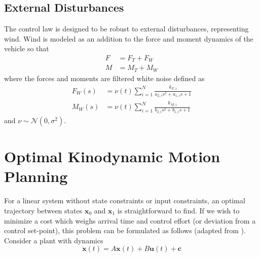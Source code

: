 \documentclass[letterpaper, 10 pt, conference]{ieeeconf}\usepackage[margin=1in]{geometry}
\begin{document}
\subsection{External Disturbances}
The control law is designed to be robust to external disturbances, representing wind. Wind is modeled as an addition to the force and moment dynamics of the vehicle so that
\begin{align}
	F &= F_T + F_W \\
	M &= M_T + M_W
\end{align}
where the forces and moments are filtered white noise defined as
\begin{align}
	F_W(s) &= \nu(t) \sum_{i=1}^N \frac{k_{F,i}}{a_{2,i}s^2 + a_{1,i}s + 1} 	\label{wind_eqn1} \\
	M_W(s) &= \nu(t) \sum_{i=1}^N \frac{k_{M,i}}{b_{2,i}s^2 + b_{1,i}s + 1} \label{wind_eqn2}
\end{align}
and $\nu \sim \mathcal{N}(0,\sigma^2)$.


\section{Optimal Kinodynamic Motion Planning}
For a linear system without state constraints or input constraints, an optimal trajectory between states $\mathbf{x}_0$ and $\mathbf{x}_1$ is straightforward to find. If we wish to minimize a cost which weighs arrival time and control effort (or deviation from a control set-point), this problem can be formulated as follows (adapted from \cite{webb2013kinodynamic}). Consider a plant with dynamics
\begin{equation}
	\dot{\mathbf{x}} (t) = A \mathbf{x}(t) + B \mathbf{u}(t) + \mathbf{c}	
\end{equation}
\end{document}
